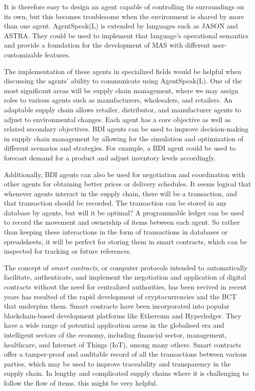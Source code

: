It is therefore easy to design an agent capable of controlling its surroundings on its own, but this becomes troublesome when the environment is shared by more than one agent. AgentSpeak(L) is extended by languages such as JASON and \ac{ASTRA}. They could be used to implement that language's operational semantics and provide a foundation for the development of \ac{MAS} with different user-customizable features.

\vspace{.5cm}

The implementation of these agents in specialized fields would be helpful when discussing the agents' ability to communicate using AgentSpeak(L). One of the most significant areas will be supply chain management, where we may assign roles to various agents such as manufacturers, wholesalers, and retailers. An adaptable supply chain allows retailer, distributor, and manufacturer agents to adjust to environmental changes. Each agent has a core objective as well as related secondary objectives. \ac{BDI} agents can be used to improve decision-making in supply chain management by allowing for the simulation and optimization of different scenarios and strategies. For example, a \ac{BDI} agent could be used to forecast demand for a product and adjust inventory levels accordingly. 

\vspace{.5cm}

Additionally, \ac{BDI} agents can also be used for negotiation and coordination with other agents for obtaining better prices or delivery schedules. It seems logical that whenever agents interact in the supply chain, there will be a transaction, and that transaction should be recorded. The transaction can be stored in any database by agents, but will it be optimal? A programmable ledger can be used to record the movement and ownership of items between each agent. So rather than keeping these interactions in the form of transactions in databases or spreadsheets, it will be perfect for storing them in smart contracts, which can be inspected for tracking or future references.	

\vspace{.5cm}

The concept of \textit{smart contracts}, or computer protocols intended to automatically facilitate, authenticate, and implement the negotiation and application of digital contracts without the need for centralized authorities, has been revived in recent years has resulted of the rapid development of cryptocurrencies and the \ac{BCT} that underpins them. Smart contracts have been incorporated into popular blockchain-based development platforms like Ethereum and Hyperledger. They have a wide range of potential application areas in the globalised era and intelligent sectors of the economy, including financial sector, management, healthcare, and Internet of Things (IoT), among many others. Smart contracts offer a tamper-proof and auditable record of all the transactions between various parties, which may be used to improve traceability and transparency in the supply chain. In lengthy and complicated supply chains where it is challenging to follow the flow of items, this might be very helpful.

